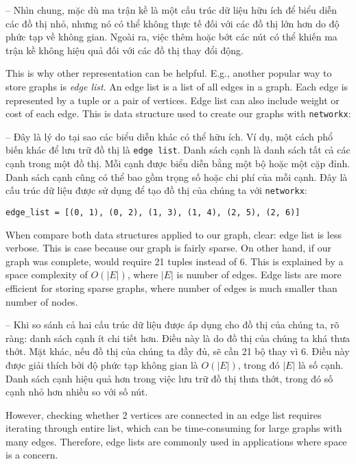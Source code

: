 \documentclass{article}
\begin{document}
\begin{itemize}
\begin{itemize}
\begin{itemize}
            -- Nhìn chung, mặc dù ma trận kề là một cấu trúc dữ liệu hữu ích để biểu diễn các đồ thị nhỏ, nhưng nó có thể không thực tế đối với các đồ thị lớn hơn do độ phức tạp về không gian. Ngoài ra, việc thêm hoặc bớt các nút có thể khiến ma trận kề không hiệu quả đối với các đồ thị thay đổi động.

            This is why other representation can be helpful. E.g., another popular way to store graphs is {\it edge list}. An edge list is a list of all edges in a graph. Each edge is represented by a tuple or a pair of vertices. Edge list can also include weight or cost of each edge. This is data structure used to create our graphs with {\tt networkx}:

            -- Đây là lý do tại sao các biểu diễn khác có thể hữu ích. Ví dụ, một cách phổ biến khác để lưu trữ đồ thị là {\tt edge list}. Danh sách cạnh là danh sách tất cả các cạnh trong một đồ thị. Mỗi cạnh được biểu diễn bằng một bộ hoặc một cặp đỉnh. Danh sách cạnh cũng có thể bao gồm trọng số hoặc chi phí của mỗi cạnh. Đây là cấu trúc dữ liệu được sử dụng để tạo đồ thị của chúng ta với {\tt networkx}:
            \begin{verbatim}
edge_list = [(0, 1), (0, 2), (1, 3), (1, 4), (2, 5), (2, 6)]
            \end{verbatim}
            When compare both data structures applied to our graph, clear: edge list is less verbose. This is case because our graph is fairly sparse. On other hand, if our graph was complete, would require 21 tuples instead of 6. This is explained by a space complexity of $O(|E|)$, where $|E|$ is number of edges. Edge lists are more efficient for storing sparse graphs, where number of edges is much smaller than number of nodes.

            -- Khi so sánh cả hai cấu trúc dữ liệu được áp dụng cho đồ thị của chúng ta, rõ ràng: danh sách cạnh ít chi tiết hơn. Điều này là do đồ thị của chúng ta khá thưa thớt. Mặt khác, nếu đồ thị của chúng ta đầy đủ, sẽ cần 21 bộ thay vì 6. Điều này được giải thích bởi độ phức tạp không gian là $O(|E|)$, trong đó $|E|$ là số cạnh. Danh sách cạnh hiệu quả hơn trong việc lưu trữ đồ thị thưa thớt, trong đó số cạnh nhỏ hơn nhiều so với số nút.

            However, checking whether 2 vertices are connected in an edge list requires iterating through entire list, which can be time-consuming for large graphs with many edges. Therefore, edge lists are commonly used in applications where space is a concern.


\end{itemize}
\end{itemize}
\end{itemize}
\end{document}
